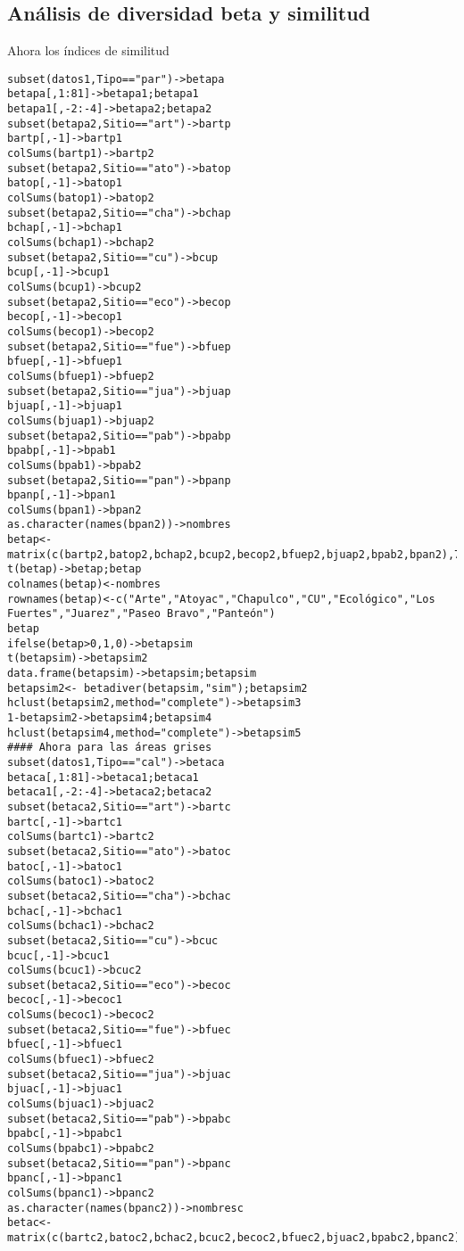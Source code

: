 \documentclass[letterpaper,12pt]{article}
\begin{document}
\subsection{Análisis de diversidad beta y similitud}
Ahora los índices de similitud
\begin{lstlisting}
subset(datos1,Tipo=="par")->betapa
betapa[,1:81]->betapa1;betapa1
betapa1[,-2:-4]->betapa2;betapa2
subset(betapa2,Sitio=="art")->bartp
bartp[,-1]->bartp1
colSums(bartp1)->bartp2
subset(betapa2,Sitio=="ato")->batop
batop[,-1]->batop1
colSums(batop1)->batop2
subset(betapa2,Sitio=="cha")->bchap
bchap[,-1]->bchap1
colSums(bchap1)->bchap2
subset(betapa2,Sitio=="cu")->bcup
bcup[,-1]->bcup1
colSums(bcup1)->bcup2
subset(betapa2,Sitio=="eco")->becop
becop[,-1]->becop1
colSums(becop1)->becop2
subset(betapa2,Sitio=="fue")->bfuep
bfuep[,-1]->bfuep1
colSums(bfuep1)->bfuep2
subset(betapa2,Sitio=="jua")->bjuap
bjuap[,-1]->bjuap1
colSums(bjuap1)->bjuap2
subset(betapa2,Sitio=="pab")->bpabp
bpabp[,-1]->bpab1
colSums(bpab1)->bpab2
subset(betapa2,Sitio=="pan")->bpanp
bpanp[,-1]->bpan1
colSums(bpan1)->bpan2
as.character(names(bpan2))->nombres
betap<-matrix(c(bartp2,batop2,bchap2,bcup2,becop2,bfuep2,bjuap2,bpab2,bpan2),77,9)
t(betap)->betap;betap
colnames(betap)<-nombres
rownames(betap)<-c("Arte","Atoyac","Chapulco","CU","Ecológico","Los Fuertes","Juarez","Paseo Bravo","Panteón")
betap
ifelse(betap>0,1,0)->betapsim
t(betapsim)->betapsim2
data.frame(betapsim)->betapsim;betapsim
betapsim2<- betadiver(betapsim,"sim");betapsim2
hclust(betapsim2,method="complete")->betapsim3
1-betapsim2->betapsim4;betapsim4
hclust(betapsim4,method="complete")->betapsim5
#### Ahora para las áreas grises
subset(datos1,Tipo=="cal")->betaca
betaca[,1:81]->betaca1;betaca1
betaca1[,-2:-4]->betaca2;betaca2
subset(betaca2,Sitio=="art")->bartc
bartc[,-1]->bartc1
colSums(bartc1)->bartc2
subset(betaca2,Sitio=="ato")->batoc
batoc[,-1]->batoc1
colSums(batoc1)->batoc2
subset(betaca2,Sitio=="cha")->bchac
bchac[,-1]->bchac1
colSums(bchac1)->bchac2
subset(betaca2,Sitio=="cu")->bcuc
bcuc[,-1]->bcuc1
colSums(bcuc1)->bcuc2
subset(betaca2,Sitio=="eco")->becoc
becoc[,-1]->becoc1
colSums(becoc1)->becoc2
subset(betaca2,Sitio=="fue")->bfuec
bfuec[,-1]->bfuec1
colSums(bfuec1)->bfuec2
subset(betaca2,Sitio=="jua")->bjuac
bjuac[,-1]->bjuac1
colSums(bjuac1)->bjuac2
subset(betaca2,Sitio=="pab")->bpabc
bpabc[,-1]->bpabc1
colSums(bpabc1)->bpabc2
subset(betaca2,Sitio=="pan")->bpanc
bpanc[,-1]->bpanc1
colSums(bpanc1)->bpanc2
as.character(names(bpanc2))->nombresc
betac<-matrix(c(bartc2,batoc2,bchac2,bcuc2,becoc2,bfuec2,bjuac2,bpabc2,bpanc2),77,9)

\end{lstlisting}
\end{document}
